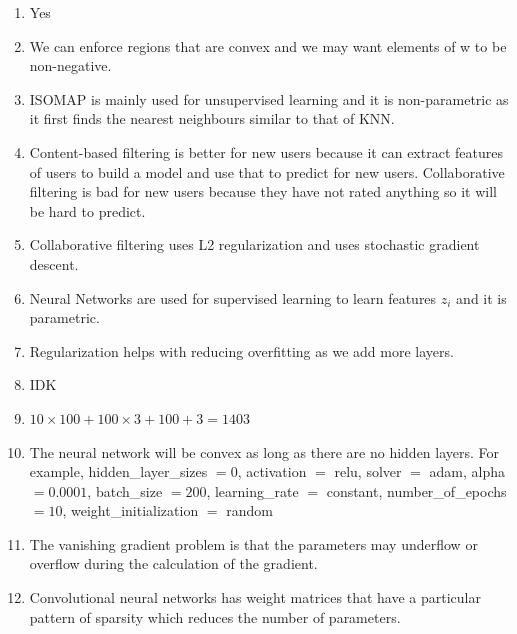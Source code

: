 \documentclass{article}
\begin{document}
\begin{enumerate}
\item Yes
\item We can enforce regions that are convex and we may want elements of w to be non-negative.
\item ISOMAP is mainly used for unsupervised learning and it is non-parametric as it first finds the nearest neighbours
similar to that of KNN. 
\item Content-based filtering is better for new users because it can extract features of users to build a model and 
use that to predict for new users. Collaborative filtering is bad for new users because they have not rated anything 
so it will be hard to predict. 
\item Collaborative filtering uses L2 regularization and uses stochastic gradient descent. 
\item Neural Networks are used for supervised learning to learn features $z_i$ and it is parametric.
\item Regularization helps with reducing overfitting as we add more layers.
\item IDK
\item $10 \times 100 + 100 \times 3 + 100 + 3 = 1403$
\item The neural network will be convex as long as there are no hidden layers. For example, hidden\_layer\_sizes $= 0$, activation $=$ relu,
solver $=$ adam, alpha $= 0.0001$, batch\_size $= 200$, learning\_rate $=$ constant, number\_of\_epochs $= 10$, weight\_initialization $=$ random 
\item The vanishing gradient problem is that the parameters may underflow or overflow during the calculation of the gradient.
\item Convolutional neural networks has weight matrices that have a particular pattern of sparsity which reduces the number
of parameters. 
\end{enumerate}
\end{document}
